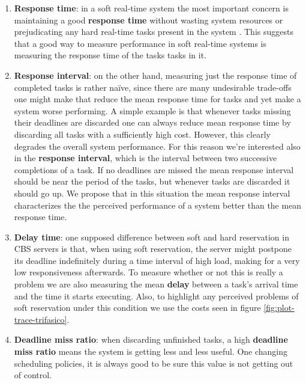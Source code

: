 \documentclass[times, 10pt,twocolumn]{article}
\begin{document}
\label{sec:metrics}

\begin{enumerate}
\item \textbf{Response time}: in a soft real-time system the most
  important concern is maintaining a good \textbf{response time}
  without wasting system resources or prejudicating any hard real-time
  tasks present in the system \cite{buttazzo05:soft}. This suggests
  that a good way to measure performance in soft real-time systems is
  measuring the response time of the tasks tasks in it.
\item \textbf{Response interval}: on the other hand, measuring just
  the response time of completed tasks is rather naïve, since there
  are many undesirable trade-offs one might make that reduce the mean
  response time for tasks and yet make a system worse performing. A
  simple example is that whenever tasks missing their deadlines are
  discarded one can always reduce mean response time by discarding all
  tasks with a sufficiently high cost. However, this clearly degrades
  the overall system performance. For this reason we're interested
  also in the \textbf{response interval}, which is the interval
  between two successive completions of a task. If no deadlines are
  missed the mean response interval should be near the period of the
  tasks, but whenever tasks are discarded it should go up. We propose
  that in this situation the mean response interval characterizes the
  the perceived performance of a system better than the mean response
  time.
\item \textbf{Delay time}: one supposed difference between soft and
  hard reservation in CBS servers is that, when using soft
  reservation, the server might postpone its deadline indefinitely
  during a time interval of high load, making for a very low
  responsiveness afterwards. To measure whether or not this is really
  a problem we are also measuring the mean \textbf{delay} between a
  task's arrival time and the time it starts executing. Also, to
  highlight any perceived problems of soft reservation under this
  condition we use the costs seen in figure
  \ref{fig:plot-trace-trifasico}.
\item \textbf{Deadline miss ratio}: when discarding unfinished tasks,
  a high \textbf{deadline miss ratio} means the system is getting less
  and less useful. One changing scheduling policies, it is always good
  to be sure this value is not getting out of control.
\end{enumerate}
\end{document}
